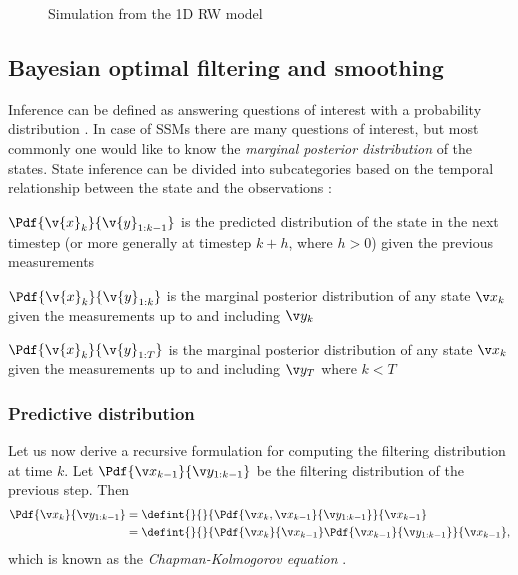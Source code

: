 \begin{figure}[htp]
\begin{center}
  \caption{Simulation from the 1D RW model}
  \label{fig:rw1d}
\end{center}
\end{figure}


\subsection{Bayesian optimal filtering and smoothing}

Inference can be defined as answering questions of interest with a probability distribution \parencite{barber2011bayesian}.
In case of SSMs there are many questions of interest, but most commonly one would
like to know the \emph{marginal posterior distribution} of the states. State inference
can be divided into subcategories based on the temporal relationship between the state
and the observations \parencite{Sarkka2006}:
\begin{description}
\addtolength{\leftskip}{1cm}
	\item[Predictive distribution]
	$\Pdf{\v{x}_{k}}{\v{y}_{1:k-1}}$ is the predicted distribution of the state in the next timestep (or more generally at timestep $k+h$, where $h>0$) 
	given the previous measurements
	\item[Filtering distribution] $\Pdf{\v{x}_k}{\v{y}_{1:k}}$ is the marginal posterior distribution
	of any state $\xk$ given the measurements up to and including $\yk$
	\item[Smoothing distribution]
	$\Pdf{\v{x}_k}{\v{y}_{1:T}}$ is the marginal posterior distribution
	of any state $\xk$ given the measurements up to and including $\y_T$ where $k<T$
\end{description} 


\subsubsection*{Predictive distribution}
Let us now derive a recursive formulation for computing the filtering distribution at time $k$. Let $\Pdf{\xkk}{\y_{1:k-1}}$
be the filtering distribution of the previous step. Then 
\begin{align}
	\Pdf{\xk}{\y_{1:k-1}}&=\defint{}{}{\Pdf{\xk,\xkk}{\y_{1:k-1}}}{\xkk} \nonumber\\
	&=\defint{}{}{\Pdf{\xk}{\xkk}\Pdf{\xkk}{\y_{1:k-1}}}{\xkk},
	\label{eq:pred_bayes}
\end{align}
which is known as the \emph{Chapman-Kolmogorov equation} \parencite{Sarkka2006}.
